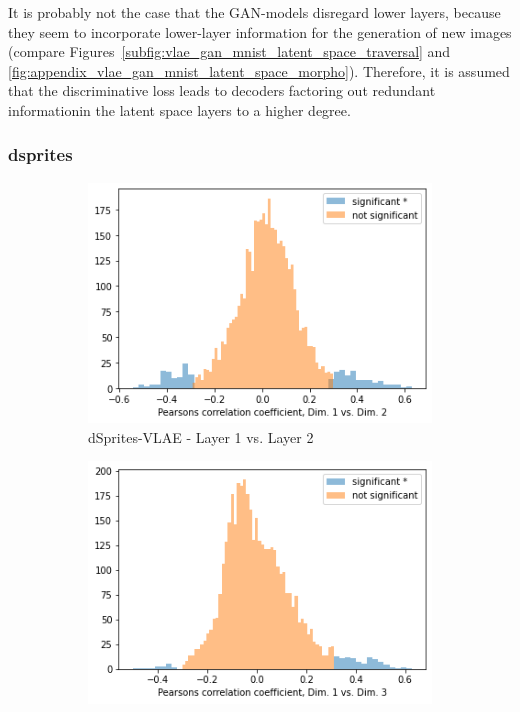 It is probably not the case that the \ac{GAN}-models disregard lower layers, because they seem to incorporate lower-layer information for the generation of new images (compare Figures~\ref{subfig:vlae_gan_mnist_latent_space_traversal} and \ref{fig:appendix_vlae_gan_mnist_latent_space_morpho}).
Therefore, it is assumed that the discriminative loss leads to decoders factoring out redundant informationin the latent space layers to a higher degree.

\subsubsection{dsprites}

\begin{figure}
    \centering
    \begin{subfigure}{.3\textwidth}
        \includegraphics[width=\textwidth]{images/notprop/dsprites/vlae/dim_1_2.png}
        \caption{dSprites-VLAE - Layer 1 vs. Layer 2}
    \end{subfigure}
    \hfill
    \begin{subfigure}{.3\textwidth}
        \includegraphics[width=\textwidth]{images/notprop/dsprites/vlae/dim_1_3.png}

\end{subfigure}
\end{figure}
